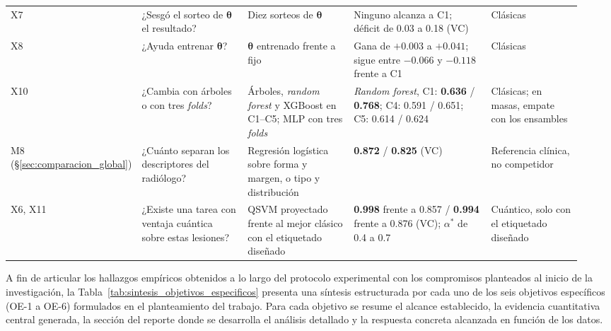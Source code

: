 \begin{table}[htbp]
\begin{adjustbox}{max width=\linewidth}
\begin{tabular}{p{0.1\linewidth} p{0.2\linewidth} p{0.2\linewidth} p{0.27\linewidth} p{0.17\linewidth}}
X7 & ¿Sesgó el sorteo de $\boldsymbol\theta$ el resultado? & Diez sorteos de $\boldsymbol\theta$ & Ninguno alcanza a C1; déficit de 0.03 a 0.18 (VC) & Clásicas \\
X8 & ¿Ayuda entrenar $\boldsymbol\theta$? & $\boldsymbol\theta$ entrenado frente a fijo & Gana de $+0.003$ a $+0.041$; sigue entre $-0.066$ y $-0.118$ frente a C1 & Clásicas \\
X10 & ¿Cambia con árboles o con tres \textit{folds}? & Árboles, \textit{random forest} y XGBoost en C1--C5; MLP con tres \textit{folds} & \textit{Random forest}, C1: \textbf{0.636} / \textbf{0.768}; C4: 0.591 / 0.651; C5: 0.614 / 0.624 & Clásicas; en masas, empate con los ensambles \\
M8 (\S\ref{sec:comparacion_global}) & ¿Cuánto separan los descriptores del radiólogo? & Regresión logística sobre forma y margen, o tipo y distribución & \textbf{0.872} / \textbf{0.825} (VC) & Referencia clínica, no competidor \\
X6, X11 & ¿Existe una tarea con ventaja cuántica sobre estas lesiones? & QSVM proyectado frente al mejor clásico con el etiquetado diseñado & \textbf{0.998} frente a 0.857 / \textbf{0.994} frente a 0.876 (VC); $\alpha^{*}$ de 0.4 a 0.7 & Cuántico, solo con el etiquetado diseñado \\
\bottomrule
\end{tabular}
\end{adjustbox}
\end{table}

A fin de articular los hallazgos empíricos obtenidos a lo largo del protocolo experimental con los compromisos
planteados al inicio de la investigación, la Tabla~\ref{tab:sintesis_objetivos_especificos} presenta una síntesis
estructurada por cada uno de los seis objetivos específicos (OE-1 a OE-6) formulados en el planteamiento del trabajo.
Para cada objetivo se resume el alcance establecido, la evidencia cuantitativa central generada, la sección del
reporte donde se desarrolla el análisis detallado y la respuesta concreta alcanzada en función de los datos.

